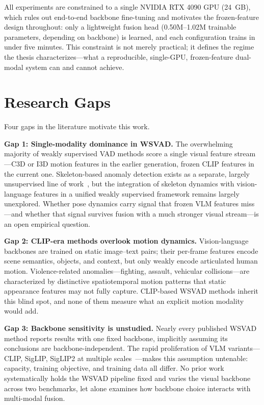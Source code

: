 All experiments are constrained to a single NVIDIA RTX 4090 GPU (24~GB), which rules out end-to-end
backbone fine-tuning and motivates the frozen-feature design throughout: only a lightweight fusion
head (0.50M--1.02M trainable parameters, depending on backbone) is learned, and each configuration
trains in under five minutes. This constraint is not merely practical; it defines the regime the
thesis characterizes---what a reproducible, single-GPU, frozen-feature dual-modal system can and
cannot achieve.

\section{Research Gaps}
\label{sec:intro-gaps}

Four gaps in the literature motivate this work.

\textbf{Gap 1: Single-modality dominance in WSVAD.} The overwhelming majority of weakly supervised
VAD methods score a single visual feature stream---C3D or I3D motion features in the earlier
generation, frozen CLIP features in the current one. Skeleton-based anomaly detection exists as a
separate, largely unsupervised line of
work~\cite{morais2019skeleton,markovitz2020gepc,hirschorn2023stgnf}, but the integration of
skeleton dynamics with vision-language features in a unified weakly supervised framework remains
largely unexplored.
Whether pose dynamics carry signal that frozen VLM features miss---and whether that signal survives
fusion with a much stronger visual stream---is an open empirical question.

\textbf{Gap 2: CLIP-era methods overlook motion dynamics.} Vision-language backbones are trained on
static image--text pairs; their per-frame features encode scene semantics, objects, and context, but
only weakly encode articulated human motion. Violence-related anomalies---fighting, assault,
vehicular collisions---are characterized by distinctive spatiotemporal motion patterns that static
appearance features may not fully capture. CLIP-based WSVAD methods inherit this blind spot, and
none of them measure what an explicit motion modality would add.

\textbf{Gap 3: Backbone sensitivity is unstudied.} Nearly every published WSVAD method reports
results with one fixed backbone, implicitly assuming its conclusions are backbone-independent. The
rapid proliferation of VLM variants---CLIP, SigLIP, SigLIP2 at multiple
scales~\cite{radford2021clip,zhai2023siglip,tschannen2025siglip2}---makes this assumption untenable:
capacity, training objective, and training data all differ. No prior work systematically holds the
WSVAD pipeline fixed and varies the visual backbone across two benchmarks, let alone examines how
backbone choice interacts with multi-modal fusion.

